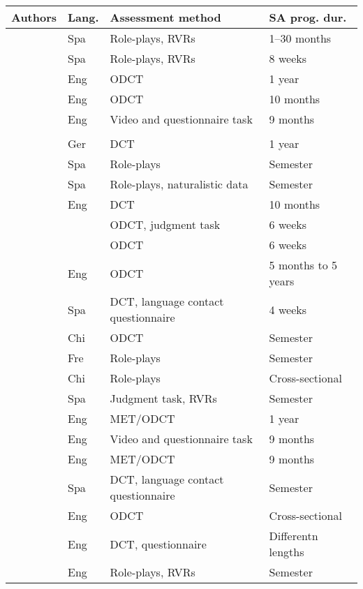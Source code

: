\documentclass[output=paper]{langscibook}
\begin{document}
    \begin{table}
    \small
    \begin{tabularx}{\textwidth}{>{\raggedright\arraybackslash}p{2.5cm}lQp{2cm}}
        \midrule
        Authors & Lang. & Assessment method & SA prog. dur.\\
        \midrule
		\citet{Félix-Brasdefer2004} & Spa & Role-plays, RVRs   & 1--30 months \\
		\citet{Félix-Brasdefer2013} & Spa & Role-plays, RVRs   & 8 weeks \\
		\citet{Ren2013} 	   & Eng & ODCT               & 1 year \\
		\citet{Ren2014}        & Eng & ODCT               & 10 months \\
		\citet{Schauer2006,Schauer2009}   & Eng & Video and questionnaire task     	  & 9 months\\
    \tablevspace
		 \\
		\citet{Barron2003,Barron2006}  & Ger  & DCT            		& 1 year \\
		\citet{Bataller2010}  & Spa & Role-plays            & Semester \\
		\citet{Shively2011}   & Spa & Role-plays, naturalistic data          & Semester \\
		\citet{ColeAnderson2001}  & Eng & DCT                  	& 10 months \\
		\citet{CzerwionkaCuza2017a}     & 		& ODCT, judgment task   & 6 weeks \\
		\citet{CzerwionkaCuza2017b}     & 		& ODCT                  & 6 weeks \\
		\citet{Han2005}       & Eng & ODCT                  & 5 months to 5 years \\
		\citet{Hernández2016} & Spa & DCT, language contact questionnaire & 4 weeks \\
		\citet{Li2014}        & Chi & ODCT                  & Semester \\
		\citet{MagnanBack2006}      & Fre  & Role-plays            & Semester \\
		\citet{Ren2019}       & Chi & Role-plays            & Cross-sectional \\
		\citet{Rodríguez2001} & Spa & Judgment task, RVRs   & Semester \\
		\citet{Schauer2004}   & Eng & MET/ODCT              & 1 year \\
		\citet{Schauer2006,Schauer2009}  & Eng & Video and questionnaire task            & 9 months \\
		\citet{Schauer2007}   & Eng & MET/ODCT              & 9 months \\
		\citet{ShivelyCohen2008}     & Spa & DCT, language contact questionnaire & Semester \\
		\citet{Taguchi2011}   & Eng & ODCT          		& Cross-sectional \\
		\citet{VilarBeltrán2014}   & Eng & DCT, questionnaire    & Differentn lengths\\
		\citet{Woodfield2012} & Eng & Role-plays, RVRs & Semester \\
\end{tabularx}
\end{table}
\end{document}
